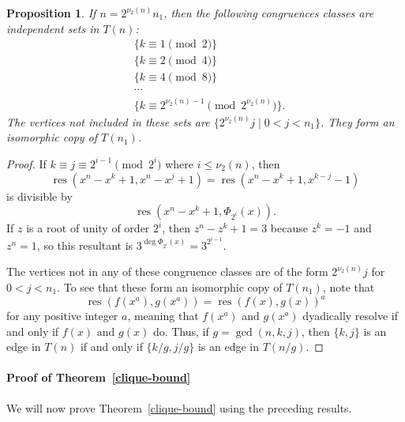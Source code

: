 \documentclass[]{article}
\newtheorem{proposition}{Proposition}[section]
\theoremstyle{definition}
\DeclareMathOperator{\res}{res}
\newcommand{\tri}[3]{\ensuremath{#1^{#2} - #1^{#3} + 1}}
\begin{document}
\begin{proposition}
    \label{independent-sets}
    If $n = 2^{\nu_2(n)} n_1$, then the following congruences classes are
    independent sets in $T(n)$:
    \begin{align*}
        &\{k \equiv 1 \pmod{2}\} \\
        &\{k \equiv 2 \pmod{4}\} \\
        &\{k \equiv 4 \pmod{8}\} \\
        &\cdots \\
        &\{k \equiv 2^{\nu_2(n) - 1} \pmod{2^{\nu_2(n)}}\}.
    \end{align*}
    The vertices not included in these sets are $\{2^{\nu_2(n)} j \mid 0 < j <
    n_1\}$. They form an isomorphic copy of $T(n_1)$.
\end{proposition}

\begin{proof}
    If $k \equiv j \equiv 2^{i - 1} \pmod{2^i}$ where $i \leq \nu_2(n)$, then
    \begin{equation*}
        \res(\tri{x}{n}{k}, \tri{x}{n}{j})
        =
        \res(\tri{x}{n}{k}, x^{k - j} - 1)
    \end{equation*}
    is divisible by
    \begin{equation*}
        \res(\tri{x}{n}{k}, \Phi_{2^i}(x)).
    \end{equation*}
    If $z$ is a root of unity of order $2^i$, then $z^n - z^k + 1 = 3$ because
    $z^k = -1$ and $z^n = 1$, so this resultant is $3^{\deg \Phi_{2^i}(x)} =
    3^{2^{i - 1}}$.

    The vertices not in any of these congruence classes are of the form
    $2^{\nu_2(n)} j$ for $0 < j < n_1$. To see that these form an isomorphic copy
    of $T(n_1)$, note that
    \begin{equation*}
        \res(f(x^a), g(x^a)) = \res(f(x), g(x))^a
    \end{equation*}
    for any positive integer $a$, meaning that $f(x^a)$ and $g(x^a)$ dyadically
    resolve if and only if $f(x)$ and $g(x)$ do. Thus, if $g = \gcd(n, k, j)$,
    then $\{k, j\}$ is an edge in $T(n)$ if and only if $\{k/g, j/g\}$ is an
    edge in $T(n/g)$.
\end{proof}

\paragraph{Proof of Theorem~\ref{clique-bound}} We will now prove
Theorem~\ref{clique-bound} using the preceding results.
\end{document}
